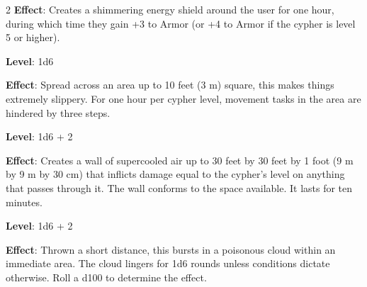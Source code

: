 \begin{multicols}{2}
\textbf{Effect}: Creates a shimmering energy shield around the user for one hour, during which time they gain +3 to Armor (or +4 to Armor if the cypher is level 5 or higher).


\textbf{Level}: 1d6

\textbf{Effect}: Spread across an area up to 10 feet (3 m) square, this makes things extremely slippery. For one hour per cypher level, movement tasks in the area are hindered by three steps.


\textbf{Level}: 1d6 + 2

\textbf{Effect}: Creates a wall of supercooled air up to 30 feet by 30 feet by 1 foot (9 m by 9 m by 30 cm) that inflicts damage equal to the cypher’s level on anything that passes through it. The wall conforms to the space available. It lasts for ten minutes.


\textbf{Level}: 1d6 + 2

\textbf{Effect}: Thrown a short distance, this bursts in a poisonous cloud within an immediate area. The cloud lingers for 1d6 rounds unless conditions dictate otherwise. Roll a d100 to determine the effect.

\end{multicols}


